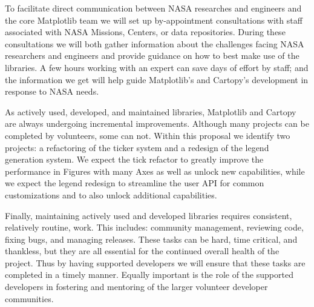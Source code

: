\documentclass[12pt]{article}
\numberwithin{page}{section}
\begin{document}
To facilitate direct communication between NASA researches and engineers and
the core Matplotlib team we will set up by-appointment consultations with staff
associated with NASA Missions, Centers, or data repositories.  During these
consultations we will both gather information about the challenges facing NASA
researchers and engineers and provide guidance on how to best make use of the
libraries. A few hours working with an expert
can save days of effort by staff; and the information we get
will help guide Matplotlib's and Cartopy's development in
response to NASA needs.

As actively used, developed, and maintained libraries, Matplotlib and Cartopy
are always undergoing incremental improvements.  Although many projects can be
completed by volunteers, some can not.  Within this proposal we identify two
projects: a refactoring of the ticker system and a redesign of the
legend generation system.  We expect the tick refactor to greatly improve the
performance in Figures with many Axes as well as unlock new capabilities, while
we expect the legend redesign to streamline the user API for common
customizations and to also unlock additional capabilities.

Finally, maintaining actively used and developed libraries requires consistent,
relatively routine, work.  This includes: community management, reviewing code,
fixing bugs, and managing releases.  These tasks can be hard, time critical,
and thankless, but they are all essential for the continued overall health of the
project.  Thus by having supported developers we will ensure that these tasks
are completed in a timely manner.  Equally important is the role of the
supported developers in fostering and mentoring
of the larger volunteer developer communities.




\end{document}
